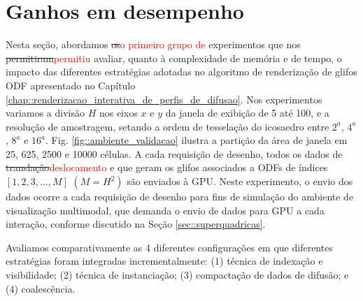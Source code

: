 \section{Ganhos em desempenho}
\label{sec::funcionalidades_agregadas_e_ganhos_de_performance}

Nesta seção, abordamos \sout{os}\textcolor{red}{o primeiro grupo de} experimentos que nos \sout{permitiram}\textcolor{red}{permitiu} avaliar, quanto à complexidade de memória e de tempo, o impacto das diferentes estratégias adotadas no algoritmo de renderização de glifos ODF apresentado no Capítulo \ref{chap::renderizacao_interativa_de_perfis_de_difusao}.
Nos experimentos variamos a divisão $H$ nos eixos $x$ e $y$ da janela de exibição de 5 até 100, e a resolução de amostragem, setando a ordem de tesselação do icosaedro entre $2^a$, $4^a$, $8^a$ e $16^a$. Fig. \ref{fig::ambiente_validacao} ilustra a partição da área de janela em 25, 625, 2500 e 10000 células. A cada requisição de desenho, todos os dados de \sout{translação}\textcolor{red}{deslocamento} e que geram os glifos associados a ODFs de índices $[1, 2, 3, ..., M]$ $(M = H^2)$ são enviados à GPU. Neste experimento, o envio dos dados ocorre a cada requisição de desenho para fins de simulação do ambiente de visualização multimodal, que demanda o envio de dados para GPU a cada interação, conforme discutido na Seção \ref{sec::superquadricas}.

 Avaliamos comparativamente as 4 diferentes configurações em que diferentes estratégias foram integradas incrementalmente: (1) técnica de indexação e visibilidade; (2) técnica de instanciação; (3) compactação de dados de difusão; e (4) coalescência.
 



